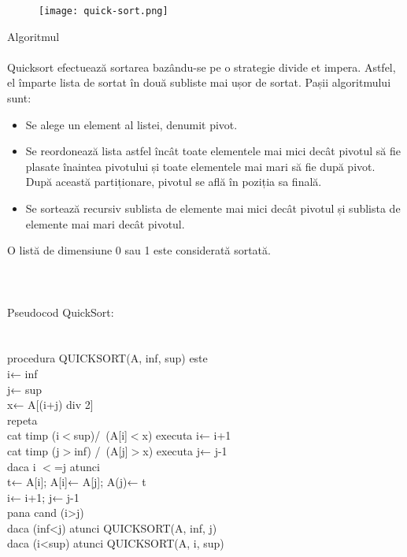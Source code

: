 \documentclass{report}
\begin{document}
\begin{figure}
\centering
\texttt{[image: quick-sort.png]}
\end{figure}

Algoritmul\\
\\
	Quicksort efectuează sortarea bazându-se pe o strategie divide et impera. Astfel, el împarte lista de sortat în două subliste mai ușor de sortat. Pașii algoritmului sunt:\\
    \begin{itemize}
  \item Se alege un element al listei, denumit pivot.
  \item Se reordonează lista astfel încât toate elementele mai mici decât pivotul să fie plasate înaintea pivotului și toate elementele mai mari să fie după pivot. După această partiționare, pivotul se află în poziția sa finală.
  \item Se sortează recursiv sublista de elemente mai mici decât pivotul și sublista de elemente mai mari decât pivotul.
\end{itemize}
O listă de dimensiune 0 sau 1 este considerată sortată.\\
\\
\\
\\

Pseudocod QuickSort:\\
\\
\\
procedura QUICKSORT(A, inf, sup) este\\
 i← inf\\
 j← sup\\
 x← A[(i+j) div 2]\\
 repeta\\
 
 cat timp (i\(<\)sup)/\ (A[i]\(<\)x) executa i← i+1\\
 cat timp (j\(>\)inf) /\ (A[j]\(>\)x) executa j← j-1\\
 daca i \(<\)=j atunci\\
   	t← A[i]; A[i]← A[j]; A(j)← t\\
   	i← i+1; j← j-1\\
            
 pana cand (i>j)\\
 daca (inf<j) atunci QUICKSORT(A, inf, j)\\
 daca (i<sup) atunci QUICKSORT(A, i, sup)\\
\end{document}
